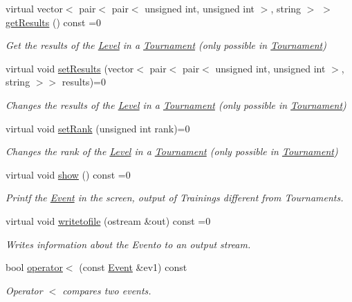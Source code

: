 \begin{DoxyCompactItemize}
virtual vector$<$ pair$<$ pair$<$ unsigned int, unsigned int $>$, string $>$ $>$ \hyperlink{class_event_a9d29f8c725da32b5fbf70ccf7961f02b}{get\+Results} () const =0
\begin{DoxyCompactList}\small\item\em Get the results of the \hyperlink{class_level}{Level} in a \hyperlink{class_tournament}{Tournament} (only possible in \hyperlink{class_tournament}{Tournament}) \end{DoxyCompactList}\item 
virtual void \hyperlink{class_event_a5ddb261642035be78677d668f9238339}{set\+Results} (vector$<$ pair$<$ pair$<$ unsigned int, unsigned int $>$, string $>$$>$ results)=0
\begin{DoxyCompactList}\small\item\em Changes the results of the \hyperlink{class_level}{Level} in a \hyperlink{class_tournament}{Tournament} (only possible in \hyperlink{class_tournament}{Tournament}) \end{DoxyCompactList}\item 
virtual void \hyperlink{class_event_a5bccaba301e9038957ec4138df404524}{set\+Rank} (unsigned int rank)=0
\begin{DoxyCompactList}\small\item\em Changes the rank of the \hyperlink{class_level}{Level} in a \hyperlink{class_tournament}{Tournament} (only possible in \hyperlink{class_tournament}{Tournament}) \end{DoxyCompactList}\item 
virtual void \hyperlink{class_event_af53c2db83404a045087a271ed3c2604f}{show} () const =0
\begin{DoxyCompactList}\small\item\em Printf the \hyperlink{class_event}{Event} in the screen, output of Trainings different from Tournaments. \end{DoxyCompactList}\item 
virtual void \hyperlink{class_event_a0c263fb7398dc2f0969a2bb22b47a40a}{writetofile} (ostream \&out) const =0
\begin{DoxyCompactList}\small\item\em Writes information about the Evento to an output stream. \end{DoxyCompactList}\item 
bool \hyperlink{class_event_a7bdc01f67b0ebca8feb9650d63c8ff08}{operator$<$} (const \hyperlink{class_event}{Event} \&ev1) const
\begin{DoxyCompactList}\small\item\em Operator $<$ compares two events. \end{DoxyCompactList}\end{DoxyCompactItemize}



